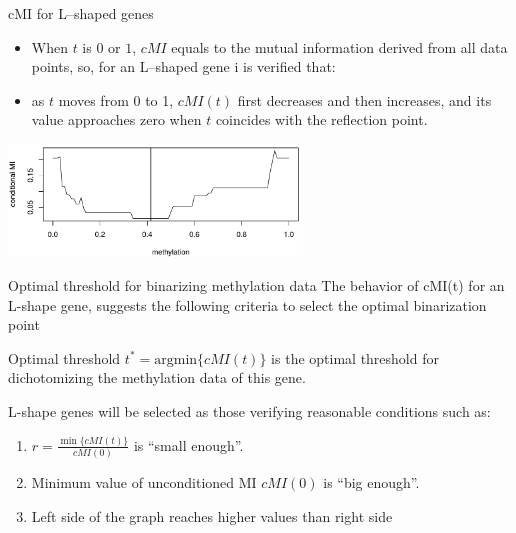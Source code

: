 \documentclass[handout]{beamer}
\begin{document}
\begin{frame} {cMI for L--shaped genes}
\begin{itemize}
\item When $t$ is $0$ or $1$, $\mathit{cMI}$ equals to the mutual information derived
from all data points, so, for an L--shaped gene i is verified that:
\item
as $t$ moves from 0 to 1, $\mathit{cMI}(t)$ first decreases and then
increases, and its value approaches zero when $t$ coincides with the reflection point.
\end{itemize}

\begin{center}
\includegraphics[height=3cm]{./images/cMI-methylation.png}
\end{center}
\end{frame}


\begin{frame} {Optimal threshold for binarizing methylation data}
The behavior of cMI(t) for an L-shape gene, suggests the following criteria to select the optimal binarization point
\begin{block}{Optimal threshold}
$t^{\ast} = \mathrm{argmin}\{ \mathit{cMI}(t) \}$ is the optimal threshold for
dichotomizing the methylation data of this gene.
\end{block}
L-shape genes will be selected as those verifying reasonable conditions such as:
\begin{enumerate}
\item $r=\frac{\min\{\mathit{cMI}(t)\}}{\mathit{cMI}(0)}$ is ``small enough''.
\item Minimum value of unconditioned MI $\mathit{cMI}(0)$ is ``big enough''.
\item Left side of the graph reaches higher values than right side
\end{enumerate}

\end{frame}

\end{document}
